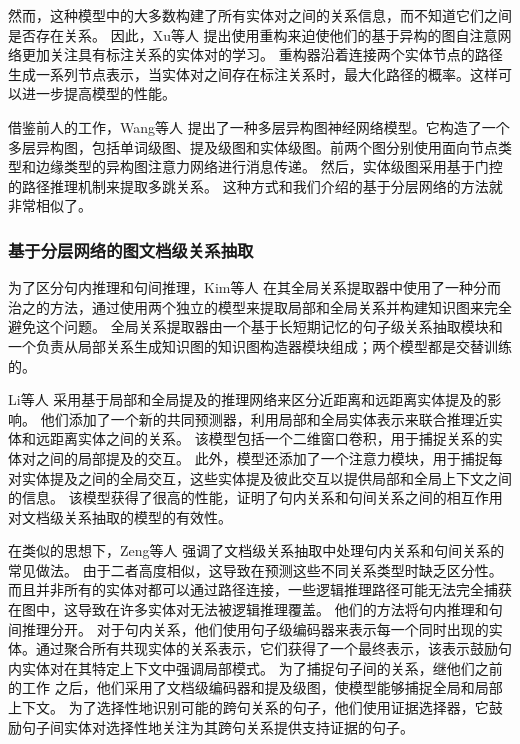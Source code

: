\documentclass[bachelor]{thesis-uestc}
\begin{document}
然而，这种模型中的大多数构建了所有实体对之间的关系信息，而不知道它们之间是否存在关系。
因此，Xu等人 \cite{Xu2020DocumentLevelRE}提出使用重构来迫使他们的基于异构的图自注意网络更加关注具有标注关系的实体对的学习。
重构器沿着连接两个实体节点的路径生成一系列节点表示，当实体对之间存在标注关系时，最大化路径的概率。这样可以进一步提高模型的性能。 \par

借鉴前人的工作，Wang等人 \cite{zhang-etal-2020-document} 提出了一种多层异构图神经网络模型。它构造了一个多层异构图，包括单词级图、提及级图和实体级图。前两个图分别使用面向节点类型和边缘类型的异构图注意力网络进行消息传递。
然后，实体级图采用基于门控的路径推理机制来提取多跳关系。
这种方式和我们介绍的基于分层网络的方法就非常相似了。\par

\subsubsection{基于分层网络的图文档级关系抽取}\label{subsec:layered-graph}

为了区分句内推理和句间推理，Kim等人 \cite{app10031181} 在其全局关系提取器中使用了一种分而治之的方法，通过使用两个独立的模型来提取局部和全局关系并构建知识图来完全避免这个问题。
全局关系提取器由一个基于长短期记忆的句子级关系抽取模块和一个负责从局部关系生成知识图的知识图构造器模块组成；两个模型都是交替训练的。\par

Li等人 \cite{li-etal-2021-mrn} 采用基于局部和全局提及的推理网络来区分近距离和远距离实体提及的影响。
他们添加了一个新的共同预测器，利用局部和全局实体表示来联合推理近实体和远距离实体之间的关系。
该模型包括一个二维窗口卷积，用于捕捉关系的实体对之间的局部提及的交互。
此外，模型还添加了一个注意力模块，用于捕捉每对实体提及之间的全局交互，这些实体提及彼此交互以提供局部和全局上下文之间的信息。
该模型获得了很高的性能，证明了句内关系和句间关系之间的相互作用对文档级关系抽取的模型的有效性。\par

在类似的思想下，Zeng等人 \cite{zeng-etal-2021-sire} 强调了文档级关系抽取中处理句内关系和句间关系的常见做法。
由于二者高度相似，这导致在预测这些不同关系类型时缺乏区分性。
而且并非所有的实体对都可以通过路径连接，一些逻辑推理路径可能无法完全捕获在图中，这导致在许多实体对无法被逻辑推理覆盖。
他们的方法将句内推理和句间推理分开。
对于句内关系，他们使用句子级编码器来表示每一个同时出现的实体。通过聚合所有共现实体的关系表示，它们获得了一个最终表示，该表示鼓励句内实体对在其特定上下文中强调局部模式。
为了捕捉句子间的关系，继他们之前的工作 \cite{GAIN}之后，他们采用了文档级编码器和提及级图，使模型能够捕捉全局和局部上下文。
为了选择性地识别可能的跨句关系的句子，他们使用证据选择器，它鼓励句子间实体对选择性地关注为其跨句关系提供支持证据的句子。\par
\end{document}
